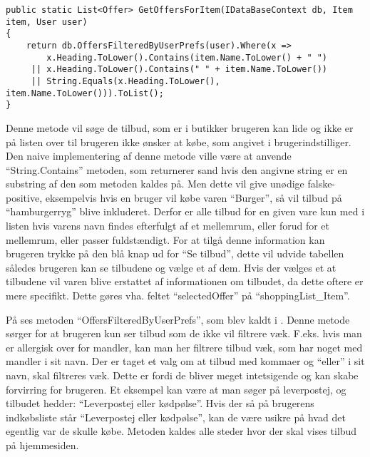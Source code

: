 \begin{lstlisting}[caption="Metoden ``GetOffersForItem'' finder relevante tilbud og returner dem som en liste", label=getoffersforitem]
public static List<Offer> GetOffersForItem(IDataBaseContext db, Item item, User user)
{
    return db.OffersFilteredByUserPrefs(user).Where(x => 
     	x.Heading.ToLower().Contains(item.Name.ToLower() + " ") 
     || x.Heading.ToLower().Contains(" " + item.Name.ToLower()) 
     || String.Equals(x.Heading.ToLower(), item.Name.ToLower())).ToList();
}
\end{lstlisting}

Denne metode vil søge de tilbud, som er i butikker brugeren kan lide og ikke er på listen over til brugeren ikke ønsker at købe, som angivet i brugerindstilliger.
Den naive implementering af denne metode ville være at anvende ``String.Contains'' metoden, som returnerer sand hvis den angivne string er en substring af den som metoden kaldes på. 
Men dette vil give unødige falske-positive, eksempelvis hvis en bruger vil købe varen ``Burger'', så vil tilbud på ``hamburgerryg'' blive inkluderet.
Derfor er alle tilbud for en given vare kun med i listen hvis varens navn findes efterfulgt af et mellemrum, eller forud for et mellemrum, eller passer fuldstændigt.
For at tilgå denne information kan brugeren trykke på den blå knap ud for  ``Se tilbud'', dette vil udvide tabellen således brugeren kan se tilbudene og vælge et af dem.
Hvis der vælges et at tilbudene vil varen blive erstattet af informationen om tilbudet, da dette oftere er mere specifikt.
Dette gøres vha. feltet ``selectedOffer'' på ``shoppingList\_Item''.

På  ses metoden ``OffersFilteredByUserPrefs'', som blev kaldt i . Denne metode sørger for at brugeren kun ser tilbud som de ikke vil filtrere væk. F.eks. hvis man er allergisk over for mandler, kan man her filtrere tilbud væk, som har noget med mandler i sit navn. Der er taget et valg om at tilbud med kommaer og ``eller'' i sit navn, skal filtreres væk. Dette er fordi de bliver meget intetsigende og kan skabe forvirring for brugeren. Et eksempel kan være at man søger på leverpostej, og tilbudet hedder: ``Leverpostej eller kødpølse''. Hvis der så på brugerens indkøbsliste står ``Leverpostej eller kødpølse'', kan de være usikre på hvad det egentlig var de skulle købe. Metoden kaldes alle steder hvor der skal vises tilbud på hjemmesiden.

